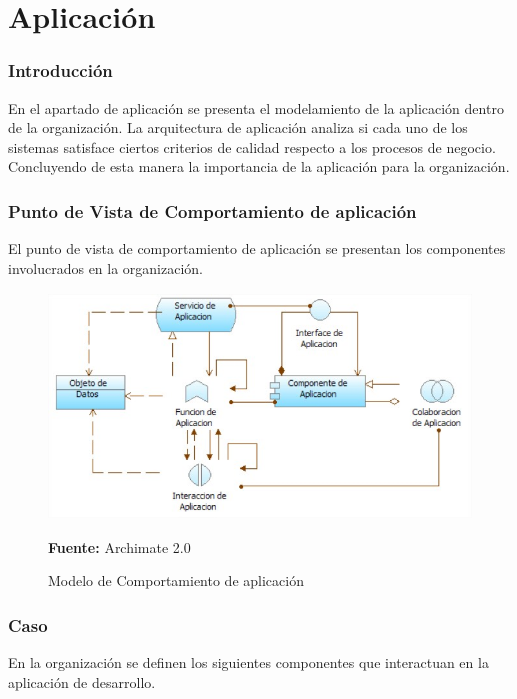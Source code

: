 \section{Aplicación}
\subsubsection{Introducción}

En el apartado de aplicación se presenta el modelamiento de la aplicación dentro de la organización. La arquitectura de aplicación analiza si cada uno de los sistemas satisface ciertos criterios de calidad respecto a los procesos de negocio. Concluyendo de esta manera la importancia de la aplicación para la organización.

\newpage

\subsubsection{Punto de Vista de Comportamiento de aplicación}

El punto de vista de comportamiento de aplicación se presentan los componentes involucrados en la organización.


\begin{figure}[th!]
	\centering
	\includegraphics[width=13cm,height=6cm]{arquitectura/aplicacion/imgs/comportamiento-e}
	\caption{Modelo de Comportamiento de aplicación}{\scriptsize \textbf{Fuente:} Archimate 2.0 \cite{WEB7}}
\end{figure}

\subsubsection{Caso}

En la organización se definen los siguientes componentes que interactuan en la aplicación de desarrollo.


